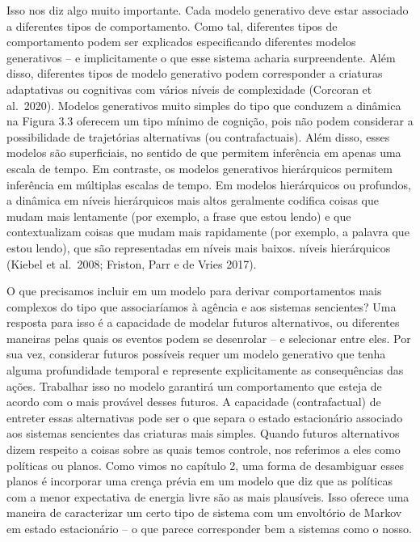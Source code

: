\documentclass[
  12pt,
]{book}
\begin{document}
Isso nos diz algo muito importante. Cada modelo generativo deve estar associado a diferentes tipos de comportamento. Como tal, diferentes tipos de comportamento podem ser explicados especificando diferentes modelos generativos -- e implicitamente o que esse sistema acharia surpreendente. Além disso, diferentes tipos de modelo generativo podem corresponder a criaturas adaptativas ou cognitivas com vários níveis de complexidade (Corcoran et al.~2020). Modelos generativos muito simples do tipo que conduzem a dinâmica na Figura 3.3 oferecem um tipo mínimo de cognição, pois não podem considerar a possibilidade de trajetórias alternativas (ou contrafactuais). Além disso, esses modelos são superficiais, no sentido de que permitem inferência em apenas uma escala de tempo. Em contraste, os modelos generativos hierárquicos permitem inferência em múltiplas escalas de tempo. Em modelos hierárquicos ou profundos, a dinâmica em níveis hierárquicos mais altos geralmente codifica coisas que mudam mais lentamente (por exemplo, a frase que estou lendo) e que contextualizam coisas que mudam mais rapidamente (por exemplo, a palavra que estou lendo), que são representadas em níveis mais baixos. níveis hierárquicos (Kiebel et al.~2008; Friston, Parr e de Vries 2017).

O que precisamos incluir em um modelo para derivar comportamentos mais complexos do tipo que associaríamos à agência e aos sistemas sencientes? Uma resposta para isso é a capacidade de modelar futuros alternativos, ou diferentes maneiras pelas quais os eventos podem se desenrolar -- e selecionar entre eles. Por sua vez, considerar futuros possíveis requer um modelo generativo que tenha alguma profundidade temporal e represente explicitamente as consequências das ações. Trabalhar isso no modelo garantirá um comportamento que esteja de acordo com o mais provável desses futuros. A capacidade (contrafactual) de entreter essas alternativas pode ser o que separa o estado estacionário associado aos sistemas sencientes das criaturas mais simples. Quando futuros alternativos dizem respeito a coisas sobre as quais temos controle, nos referimos a eles como políticas ou planos. Como vimos no capítulo 2, uma forma de desambiguar esses planos é incorporar uma crença prévia em um modelo que diz que as políticas com a menor expectativa de energia livre são as mais plausíveis. Isso oferece uma maneira de caracterizar um certo tipo de sistema com um envoltório de Markov em estado estacionário -- o que parece corresponder bem a sistemas como o nosso.
\end{document}
